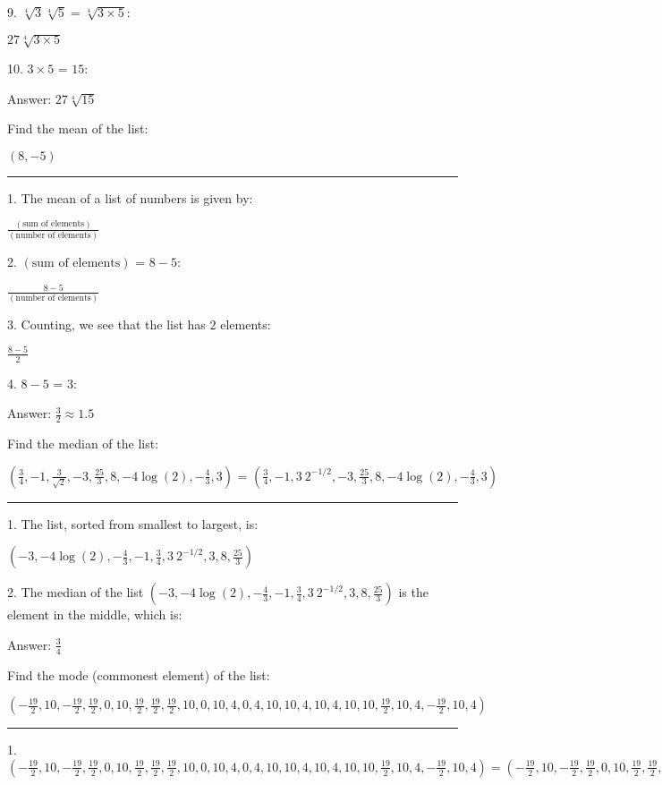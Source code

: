 \documentclass{article}
\begin{document}
9. $\sqrt[4]{3} \sqrt[4]{5}=\sqrt[4]{3\times 5}$:

$27 \sqrt[4]{3\times 5}$

10. $3\times 5\text{ = }15:$

Answer: $27 \sqrt[4]{15}$

\pagebreak

Find the mean of the list:

$(8,-5)$

\hrule

1. The mean of a list of numbers is given by:

$\frac{(\text{sum of elements})}{(\text{number of elements})}$

2. $(\text{sum of elements})\text{ = }8-5:$

$\frac{8-5}{(\text{number of elements})}$

3. Counting, we see that the list has $2$ elements:

$\frac{8-5}{2}$

4. $8-5\text{ = }3:$

Answer: $\frac{3}{2}\approx 1.5$

\pagebreak

Find the median of the list:

$\left(\frac{3}{4},-1,\frac{3}{\sqrt{2}},-3,\frac{25}{3},8,-4 \log (2),-\frac{4}{3},3\right)\text{ = }\left(\frac{3}{4},-1,3\ 2^{-1/2},-3,\frac{25}{3},8,-4 \log (2),-\frac{4}{3},3\right)$

\hrule

1. The list, sorted from smallest to largest, is:

$\left(-3,-4 \log (2),-\frac{4}{3},-1,\frac{3}{4},3\ 2^{-1/2},3,8,\frac{25}{3}\right)$

2. The median of the list $\left(-3,-4 \log (2),-\frac{4}{3},-1,\frac{3}{4},3\ 2^{-1/2},3,8,\frac{25}{3}\right)$ is the element in the middle, which is:

Answer: $\frac{3}{4}$

\pagebreak

Find the mode (commonest element) of the list:

$\left(-\frac{19}{2},10,-\frac{19}{2},\frac{19}{2},0,10,\frac{19}{2},\frac{19}{2},\frac{19}{2},10,0,10,4,0,4,10,10,4,10,4,10,10,\frac{19}{2},10,4,-\frac{19}{2},10,4\right)$

\hrule

1. $\left(-\frac{19}{2},10,-\frac{19}{2},\frac{19}{2},0,10,\frac{19}{2},\frac{19}{2},\frac{19}{2},10,0,10,4,0,4,10,10,4,10,4,10,10,\frac{19}{2},10,4,-\frac{19}{2},10,4\right)=\left(-\frac{19}{2},10,-\frac{19}{2},\frac{19}{2},0,10,\frac{19}{2},\frac{19}{2},\frac{19}{2},10,0,10,4,0,4,10,10,4,10,4,10,10,\frac{19}{2},10,4,-\frac{19}{2},10,4\right):$
\end{document}

